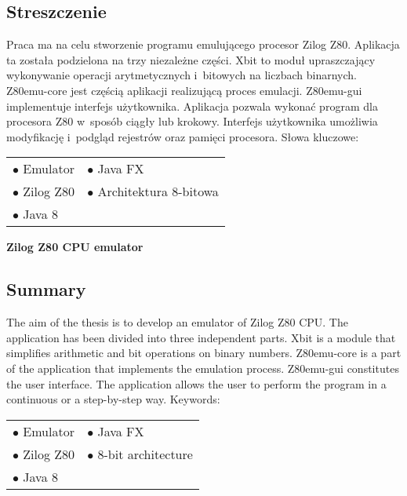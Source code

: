 \thispagestyle{empty}
\makeatletter
\begin{center}
	\large \textbf{\@title}
\end{center} 
\makeatother

\subsection*{Streszczenie}
Praca ma na celu stworzenie programu emulującego procesor Zilog Z80. Aplikacja ta została podzielona na trzy niezależne części. Xbit to moduł upraszczający wykonywanie operacji arytmetycznych i~bitowych na liczbach binarnych. Z80emu-core jest częścią aplikacji realizującą proces emulacji. Z80emu-gui implementuje interfejs użytkownika. Aplikacja pozwala wykonać program dla procesora Z80 w~sposób ciągły lub krokowy. Interfejs użytkownika umożliwia modyfikację i~podgląd rejestrów oraz pamięci procesora.
\newline
Słowa kluczowe:
\begin{table}[!h]
\label{kluczowe}
\begin{tabular}{l l}

$\bullet$ Emulator          &  $\bullet$ Java FX \\
$\bullet$ Zilog Z80                              &       $\bullet$ Architektura 8-bitowa \\
$\bullet$ Java 8     &        \\

\end{tabular}
\end{table}

\makeatletter
\begin{center}
	\large \textbf{Zilog Z80 CPU emulator}
\end{center} 
\makeatother

\subsection*{Summary}
The aim of the thesis is to develop an emulator of Zilog Z80 CPU. The application has been divided into three independent parts. Xbit is a module that simplifies arithmetic and bit operations on binary numbers. Z80emu-core is a part of the application that implements the emulation process. Z80emu-gui constitutes the user interface. The application allows the user to perform the program in a continuous or a step-by-step way.
\newline
Keywords:

\begin{table}[!h]
\label{keyword}
\begin{tabular}{l l}

$\bullet$ Emulator          &  $\bullet$ Java FX \\
$\bullet$ Zilog Z80                              &       $\bullet$ 8-bit architecture \\
$\bullet$ Java 8     &        \\

\end{tabular}
\end{table}